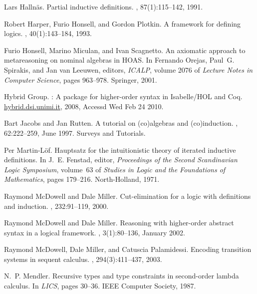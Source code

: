 \documentclass[preprint]{elsarticle}
\begin{document}
\begin{thebibliography}{10}
Lars Halln{\"{a}}s.
\newblock Partial inductive definitions.
, 87(1):115--142, 1991.

Robert Harper, Furio Honsell, and Gordon Plotkin.
\newblock A framework for defining logics.
, 40(1):143--184, 1993.

Furio Honsell, Marino Miculan, and Ivan Scagnetto.
\newblock An axiomatic approach to metareasoning on nominal algebras in {HOAS}.
\newblock In Fernando Orejas, Paul~G. Spirakis, and Jan van Leeuwen, editors,
  {\em ICALP}, volume 2076 of {\em Lecture Notes in Computer Science}, pages
  963--978. Springer, 2001.

{Hybrid Group}.
: {A} package for higher-order syntax in {Isabelle/HOL} and
  {Coq}.
\newblock \url{hybrid.dsi.unimi.it}, 2008, Accessd Wed Feb 24 2010.

Bart Jacobs and Jan Rutten.
\newblock A tutorial on (co)algebras and (co)induction.
, 62:222--259, June 1997.
\newblock Surveys and Tutorials.

Per Martin-L{\"{o}}f.
\newblock Hauptsatz for the intuitionistic theory of iterated inductive
  definitions.
\newblock In J.~E. Fenstad, editor, {\em Proceedings of the Second Scandinavian
  Logic Symposium}, volume~63 of {\em Studies in Logic and the Foundations of
  Mathematics}, pages 179--216. North-Holland, 1971.

Raymond McDowell and Dale Miller.
\newblock Cut-elimination for a logic with definitions and induction.
, 232:91--119, 2000.

Raymond McDowell and Dale Miller.
\newblock Reasoning with higher-order abstract syntax in a logical framework.
, 3(1):80--136, January
  2002.

Raymond McDowell, Dale Miller, and Catuscia Palamidessi.
\newblock Encoding transition systems in sequent calculus.
, 294(3):411--437, 2003.

N.~P. Mendler.
\newblock Recursive types and type constraints in second-order lambda calculus.
\newblock In {\em LICS}, pages 30--36. IEEE Computer Society, 1987.


\end{thebibliography}
\end{document}
